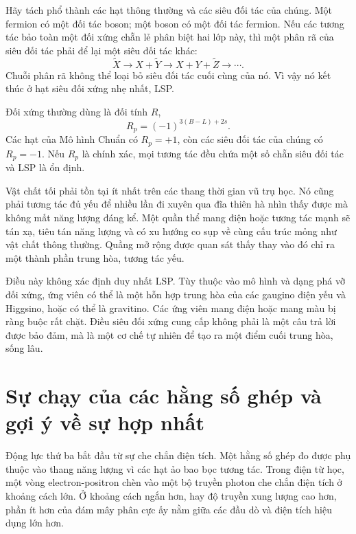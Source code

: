 Hãy tách phổ thành các hạt thông thường và các siêu đối tác của chúng. Một fermion có một đối tác boson; một boson có một đối tác fermion. Nếu các tương tác bảo toàn một đối xứng chẵn lẻ phân biệt hai lớp này, thì một phân rã của siêu đối tác phải để lại một siêu đối tác khác:
\begin{equation}
\widetilde X
\longrightarrow X+\widetilde Y
\longrightarrow X+Y+\widetilde Z
\longrightarrow\cdots.
\end{equation}
Chuỗi phân rã không thể loại bỏ siêu đối tác cuối cùng của nó. Vì vậy nó kết thúc ở hạt siêu đối xứng nhẹ nhất, LSP.

Đối xứng thường dùng là đối tính \(R\),
\begin{equation}
R_p=(-1)^{3(B-L)+2s}.
\end{equation}
Các hạt của Mô hình Chuẩn có \(R_p=+1\), còn các siêu đối tác của chúng có \(R_p=-1\). Nếu \(R_p\) là chính xác, mọi tương tác đều chứa một số chẵn siêu đối tác và LSP là ổn định.

Vật chất tối phải tồn tại ít nhất trên các thang thời gian vũ trụ học. Nó cũng phải tương tác đủ yếu để nhiều lần đi xuyên qua đĩa thiên hà nhìn thấy được mà không mất năng lượng đáng kể. Một quần thể mang điện hoặc tương tác mạnh sẽ tán xạ, tiêu tán năng lượng và có xu hướng co sụp về cùng cấu trúc mỏng như vật chất thông thường. Quầng mở rộng được quan sát thấy thay vào đó chỉ ra một thành phần trung hòa, tương tác yếu.

Điều này không xác định duy nhất LSP. Tùy thuộc vào mô hình và dạng phá vỡ đối xứng, ứng viên có thể là một hỗn hợp trung hòa của các gaugino điện yếu và Higgsino, hoặc có thể là gravitino. Các ứng viên mang điện hoặc mang màu bị ràng buộc rất chặt. Điều siêu đối xứng cung cấp không phải là một câu trả lời được bảo đảm, mà là một cơ chế tự nhiên để tạo ra một điểm cuối trung hòa, sống lâu.

\section{Sự chạy của các hằng số ghép và gợi ý về sự hợp nhất}

Động lực thứ ba bắt đầu từ sự che chắn điện tích. Một hằng số ghép đo được phụ thuộc vào thang năng lượng vì các hạt ảo bao bọc tương tác. Trong điện từ học, một vòng electron-positron chèn vào một bộ truyền photon che chắn điện tích ở khoảng cách lớn. Ở khoảng cách ngắn hơn, hay độ truyền xung lượng cao hơn, phần ít hơn của đám mây phân cực ấy nằm giữa các đầu dò và điện tích hiệu dụng lớn hơn.

